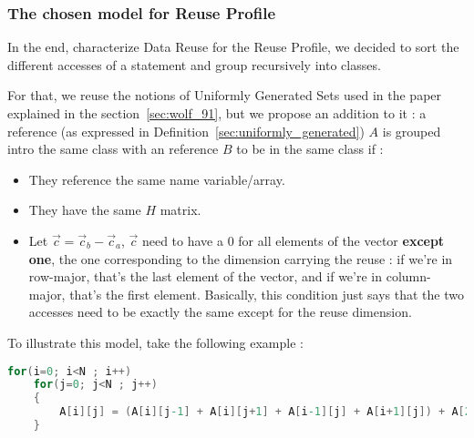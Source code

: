 \documentclass[paper=a4, fontsize=11pt]{scrartcl}
\numberwithin{equation}{section}        %
\numberwithin{figure}{section}          %
\numberwithin{table}{section}               %
\begin{document}

        \subsubsection{The chosen model for Reuse Profile}
            In the end, characterize Data Reuse for the Reuse Profile, we decided to
            sort the different accesses of a statement and group recursively into classes.

            For that, we reuse the notions of Uniformly Generated Sets used in the paper~\cite{Wolf'91}
            explained in the section~\ref{sec:wolf_91}, but we propose an addition to it :
            a reference (as expressed in Definition~\ref{sec:uniformly_generated}) $A$ is 
            grouped intro the same class with an reference $B$ to be in the same class if :
            \begin{itemize}
                \item They reference the same name variable/array.
                \item They have the same $H$ matrix.
                \item Let $\vec{c}=\vec{c}_b - \vec{c}_a$, $\vec{c}$ need to have a $0$
                    for all elements of the vector \textbf{except one}, the one corresponding
                    to the dimension carrying the reuse : if we're in row-major, that's the
                    last element of the vector, and if we're in column-major, that's the first
                    element. Basically, this condition just says that the two accesses need
                    to be exactly the same except for the reuse dimension.
            \end{itemize}

            \bigskip

            To illustrate this model, take the following example :

\begin{lstlisting}[frame=single, language=C, caption=Reuse Profiling example, label={lst:rp_example_0}]
for(i=0; i<N ; i++)
    for(j=0; j<N ; j++)
    {
        A[i][j] = (A[i][j-1] + A[i][j+1] + A[i-1][j] + A[i+1][j]) + A[2*i][j] + B[i][j]) / 6.0; //S1
    }
\end{lstlisting}
\end{document}

